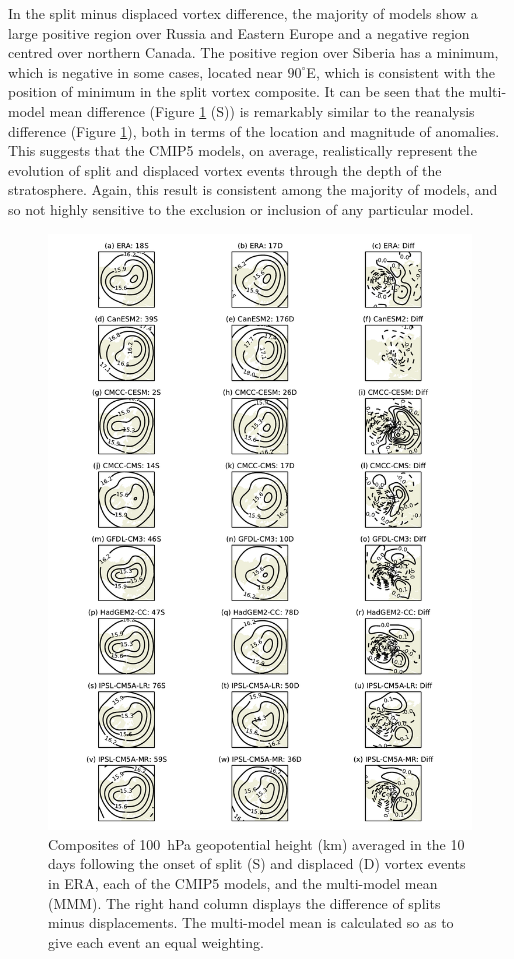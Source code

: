 In the split minus displaced vortex difference, the majority of models show a
large positive region over Russia and Eastern Europe and a negative region
centred over northern Canada. The positive region over Siberia has a minimum,
which is negative in some cases, located near $90^{\circ}$E, which is consistent
with the position of minimum in the split vortex composite. It can be seen that
the multi-model mean difference (Figure \ref{fig:cmip5_100hPa_comp} (S)) is
remarkably similar to the reanalysis difference (Figure
\ref{fig:cmip5_100hPa_comp}), both in terms of the location and magnitude of
anomalies. This suggests that the CMIP5 models, on average, realistically
represent the evolution of split and displaced vortex events through the depth
of the stratosphere. Again, this result is consistent among the majority of
models, and so not highly sensitive to the exclusion or inclusion of any
particular model. 

\begin{figure}
 \centering
 \noindent\includegraphics[width=\textwidth]{figures/chapter-models/100hPa_GPH1.pdf}
 \caption[NAM composites for splits and displacements in the CMIP5
 models]{Composites of 100~hPa geopotential height (km) averaged in the 10 days
   following the onset of split (S) and displaced (D) vortex events in ERA, each
   of the CMIP5 models, and the multi-model mean (MMM). The right hand column
   displays the difference of splits minus displacements. The multi-model mean
   is calculated so as to give each event an equal weighting.}
 \label{fig:cmip5_100hPa_comp}
\end{figure}

